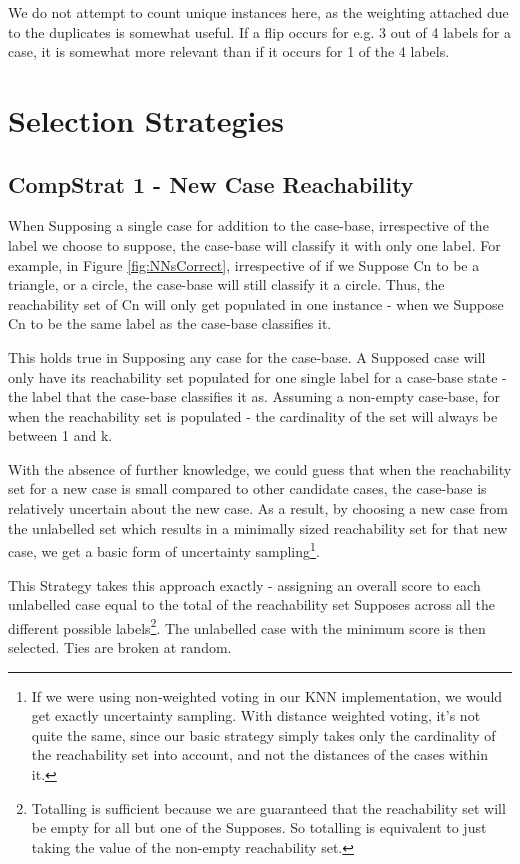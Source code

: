 \documentclass[a4paper,11pt]{report}
\begin{document}
We do not attempt to count unique instances here, as the weighting attached due to the duplicates is somewhat useful. If a flip occurs for e.g. 3 out of 4 labels for a case, it is somewhat more relevant than if it occurs for 1 of the 4 labels.

\section{Selection Strategies}
\subsection{CompStrat 1 - New Case Reachability\label{sec:compstrat1}}
When Supposing a single case for addition to the case-base, irrespective of the label we choose to suppose, the case-base will classify it with only one label. For example, in Figure \ref{fig:NNsCorrect}, irrespective of if we Suppose Cn to be a triangle, or a circle, the case-base will still classify it a circle. Thus, the reachability set of Cn will only get populated in one instance - when we Suppose Cn to be the same label as the case-base classifies it.

This holds true in Supposing any case for the case-base. A Supposed case will only have its reachability set populated for one single label for a case-base state - the label that the case-base classifies it as. Assuming a non-empty case-base, for when the reachability set is populated - the cardinality of the set will always be between 1 and k.

With the absence of further knowledge, we could guess that when the reachability set for a new case is small compared to other candidate cases, the case-base is relatively uncertain about the new case. As a result, by choosing a new case from the unlabelled set which results in a minimally sized reachability set for that new case, we get a basic form of uncertainty sampling\footnote{If we were using non-weighted voting in our KNN implementation, we would get exactly uncertainty sampling. With distance weighted voting, it's not quite the same, since our basic strategy simply takes only the cardinality of the reachability set into account, and not the distances of the cases within it.}.

This Strategy takes this approach exactly - assigning an overall score to each unlabelled case equal to the total of the reachability set Supposes across all the different possible labels\footnote{Totalling is sufficient because we are guaranteed that the reachability set will be empty for all but one of the Supposes. So totalling is equivalent to just taking the value of the non-empty reachability set.}. The unlabelled case with the minimum score is then selected. Ties are broken at random.
\end{document}
